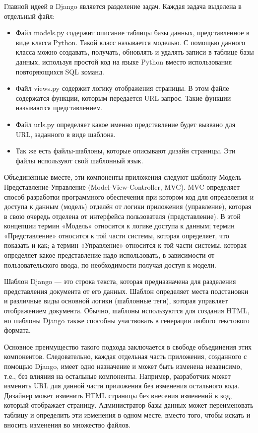 \documentclass[a4paper]{report}
\begin{document}
Главной идеей в Django является разделение задач. Каждая задача выделена в отдельный файл:
\begin{itemize}
	\item Файл models.py содержит описание таблицы базы данных, представленное в виде класса Python. Такой класс называется моделью. С помощью данного класса можно создавать, получать, обновлять и удалять записи в таблице базы данных, используя простой код на языке Python вместо использования повторяющихся SQL команд.
	\item Файл views.py содержит логику отображения страницы. В этом файле содержатся функции, которым передается URL запрос. Такие функции называются представлением.
	\item Файл urls.py определяет какое именно представление будет вызвано для URL, заданного в виде шаблона. 
	\item Так же есть файлы-шаблоны, которые описывают дизайн страницы. Эти файлы используют свой шаблонный язык.
\end{itemize}

 Объединённые вместе, эти компоненты приложения следуют шаблону Модель-Представление-Управление  (Model-View-Controller, MVC). MVC определяет способ разработки программного обеспечения при котором код для определения и доступа к данным (модель) отделён от логики приложения (управление), которая в свою очередь отделена от интерфейса пользователя (представление). В этой концепции термин «Модель» относится к логике доступа к данным; термин «Представление» относится к той части системы, которая определяет, что показать и как; а термин «Управление» относится к той части системы, которая определяет какое представление надо использовать, в зависимости от пользовательского ввода, по необходимости получая доступ к модели. 

Шаблон Django — это строка текста, которая предназначена для разделения представления документа от его данных. Шаблон определяет места подстановки и различные виды основной логики (шаблонные теги), которая управляет отображением документа. Обычно, шаблоны используются для создания HTML, но шаблоны Django также способны участвовать в генерации любого текстового формата.

Основное преимущество такого подхода заключается в свободе объединения этих компонентов. Следовательно, каждая отдельная часть приложения, созданного с помощью Django, имеет одно назначение и может быть изменена независимо, т.е., без влияния на остальные компоненты. Например, разработчик может изменить URL для данной части приложения без изменения остального кода. Дизайнер может изменить HTML страницы без внесения изменений в код, который отображает страницу. Администратор базы данных может переименовать таблицу и определить эти изменения в одном месте, вместо того, чтобы искать и вносить изменения во множество файлов.
\end{document}
